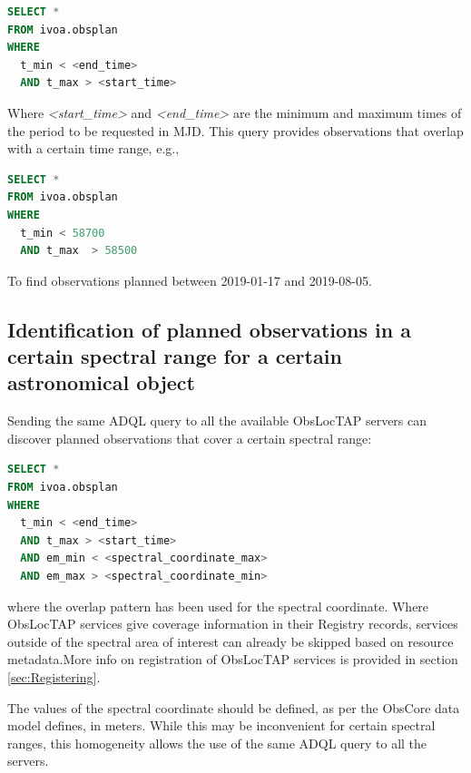 \documentclass[11pt,a4paper]{ivoa}
\begin{document}
\begin{lstlisting}[language=SQL]
SELECT * 
FROM ivoa.obsplan 
WHERE
  t_min < <end_time>
  AND t_max > <start_time>
\end{lstlisting}
Where \textit{<start\_time>} and \textit{<end\_time> }are the minimum and
maximum times of the period to be requested in MJD. This query provides
observations that overlap with a certain time range, e.g.,

\begin{lstlisting}[language=SQL]
SELECT *
FROM ivoa.obsplan
WHERE
  t_min < 58700
  AND t_max  > 58500
\end{lstlisting}

To find observations planned between 2019-01-17 and 2019-08-05.

\subsection{Identification of planned observations in a certain spectral range
for a certain astronomical object}
Sending the same ADQL query to all the available ObsLocTAP servers can discover
planned observations that cover a certain spectral range:

\begin{lstlisting}[language=SQL]
SELECT *
FROM ivoa.obsplan
WHERE
  t_min < <end_time>
  AND t_max > <start_time>
  AND em_min < <spectral_coordinate_max>
  AND em_max > <spectral_coordinate_min>
\end{lstlisting}
where the overlap pattern has been used for the spectral coordinate.
Where ObsLocTAP services give coverage information in their Registry records,
services outside of the spectral area of interest can already be skipped based
on resource metadata.More info on registration of ObsLocTAP services is provided
in section \ref{sec:Registering}.
\par

The values of the spectral coordinate should be defined, as per the ObsCore data
model defines, in meters. While this may be inconvenient for certain spectral
ranges, this homogeneity allows the use of the same ADQL query to all the
servers.
\end{document}
